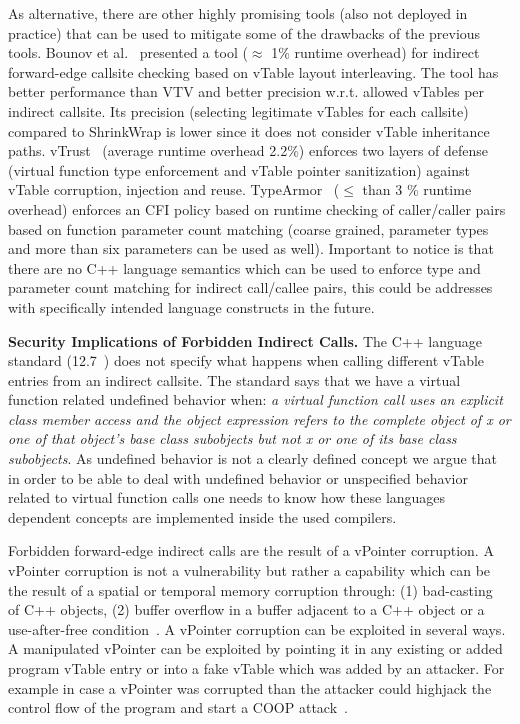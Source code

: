 As alternative, there are other highly promising tools (also not deployed in practice) that can be used to mitigate 
some of the drawbacks of the previous tools. 
Bounov et al.~\cite{bounov:interleaving} presented a tool ($\approx$ 1\% runtime overhead)
for indirect forward-edge callsite checking based on vTable layout interleaving. The tool has better performance
than VTV and better precision w.r.t. allowed vTables per indirect callsite. Its precision (selecting legitimate vTables for each callsite)
compared to ShrinkWrap is lower since it does not consider vTable inheritance paths.
vTrust~\cite{zhang:vtrust} (average runtime overhead 2.2\%) enforces two layers of defense (virtual function type enforcement and vTable pointer sanitization)
against vTable corruption, injection and reuse.
TypeArmor~\cite{veen:typearmor} ($\le$ than 3 \% runtime overhead) enforces an CFI policy based on runtime checking of caller/caller pairs based
on function parameter count matching (coarse grained, parameter types and more than six parameters can be used as well).
Important to notice is that there are no C++ language semantics which can be used to enforce type and 
parameter count matching for indirect call/callee pairs, this could be addresses with specifically intended language constructs in the future.

\textbf{Security Implications of Forbidden Indirect Calls.}
\label{Security Implications of Forbidden Forward Indirect Calls}
The C++ language standard (12.7~\cite{iso:iecN3690}) does not specify
what happens when calling different vTable entries from an indirect callsite.
The standard says that we have a virtual function related undefined behavior when:
\textit{a virtual function call uses an explicit class member access and the object expression refers to the complete
object of x or one of that object’s base class subobjects but not x or one of its base class subobjects}.
As undefined behavior is not a clearly defined concept we argue that in order to be able to deal
with undefined behavior or  unspecified behavior related to virtual function calls one needs to know
how these languages dependent concepts are implemented inside the used compilers.

Forbidden forward-edge indirect calls are the result of a vPointer corruption.
A vPointer corruption is not a vulnerability but rather a capability which 
can be the result of a spatial or temporal memory corruption through: 
(1) bad-casting~\cite{byoungyoung:typecasting} of C++ objects, 
(2) buffer overflow in a buffer adjacent to a C++ object or a use-after-free condition~\cite{schuster:coop}.
A vPointer corruption can be exploited in several ways. A manipulated vPointer
can be exploited by pointing it in any existing or added program vTable entry 
or into a fake vTable which was added by an attacker. For example in case a vPointer
was corrupted than the attacker could highjack the control flow of the program 
and start a COOP attack~\cite{schuster:coop}.

